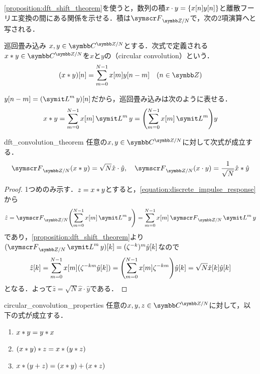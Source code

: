 \documentclass[../../main]{subfiles}
\begin{document}
\cref{proposition:dft_shift_theorem}を使うと，数列の積\(x\cdot y=\lbrace x[n]y[n]\rbrace\)と離散フーリエ変換の間にある関係を示せる．積は\(\dft{N}\)で，次の2項演算へと写される．

\begin{definition}{巡回畳み込み}{}
  \(x,y\in\cycles{\numset{C}}{N}\)とする．次式で定義される\(x\circconv y\in\cycles{\numset{C}}{N}\)を\(x\)と\(y\)の（circular convolution）という．
  \[
    (x\circconv y)[n] = \sum_{m=0}^{N-1}x[m]y[n-m]\quad(n\in\numset{Z})
  \]
\end{definition}

\(y[n-m]=(\lagop^my)[n]\)だから，巡回畳み込みは次のように表せる．
\begin{equation}
  \label{equation:discrete_impulse_response}
  x\circconv y = \sum_{m=0}^{N-1}x[m]\lagop^my
  = \pqty*{\sum_{m=0}^{N-1}x[m]\lagop^m}y
\end{equation}

\begin{proposition}{}{dft_convolution_theorem}
  任意の\(x,y\in\cycles{\numset{C}}{N}\)に対して次式が成立する．
  \[
    \dft{N}(x\circconv y) = \sqrt{N}\hat{x}\cdot\hat{y},
    \quad\dft{N}(x\cdot y) = \frac{1}{\sqrt{N}}\hat{x}\circconv\hat{y}
  \]
\end{proposition}

\begin{proof}
  1つめのみ示す．\(z=x\ast y\)とすると，\cref{equation:discrete_impulse_response}から
  \[
    \hat{z} = \dft{N}\pqty*{\sum_{m=0}^{N-1}x[m]\lagop^my}
    = \sum_{m=0}^{N-1}x[m]\dft{N}\lagop^my
  \]
  であり，\cref{proposition:dft_shift_theorem}より\((\dft{N}\lagop^my)[k]=(\zeta^{-k})^m\hat{y}[k]\)なので
  \[
    \hat{z}[k] = \sum_{m=0}^{N-1}x[m](\zeta^{-km}\hat{y}[k])
    = \pqty*{\sum_{m=0}^{N-1}x[m]\zeta^{-km}}\hat{y}[k]
    = \sqrt{N}\hat{x}[k]\hat{y}[k]
  \]
  となる．よって\(\hat{z}=\sqrt{N}\hat{x}\cdot\hat{y}\)である．
\end{proof}

\begin{corollary}{}{circular_convolution_properties}
  任意の\(x,y,z\in\cycles{\numset{C}}{N}\)に対して，以下の式が成立する．
  \begin{enumerate}
    \item \(x\ast y=y\ast x\)
    \item \((x\ast y)\ast z=x\ast (y\ast z)\)
    \item \(x\ast(y+z)=(x\ast y)+(x\ast z)\)
  \end{enumerate}
\end{corollary}
\end{document}
